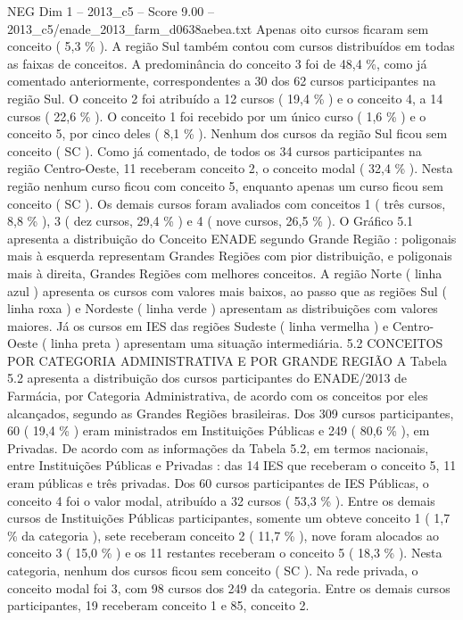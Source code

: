 \begin{textsample}{NEG Dim 1 – 2013\_c5 – Score 9.00 – 2013\_c5/enade\_2013\_farm\_d0638aebea.txt}
Apenas oito cursos ficaram sem conceito ( 5,3 \% ).
A região Sul também contou com cursos distribuídos em todas as faixas de conceitos.
A predominância do conceito 3 foi de 48,4 \%, como já comentado anteriormente, correspondentes a 30 dos 62 cursos participantes na região Sul.
O conceito 2 foi atribuído a 12 cursos ( 19,4 \% ) e o conceito 4, a 14 cursos ( 22,6 \% ).
O conceito 1 foi recebido por um único curso ( 1,6 \% ) e o conceito 5, por cinco deles ( 8,1 \% ).
Nenhum dos cursos da região Sul ficou sem conceito ( SC ).
Como já comentado, de todos os 34 cursos participantes na região Centro-Oeste, 11 receberam conceito 2, o conceito modal ( 32,4 \% ).
Nesta região nenhum curso ficou com conceito 5, enquanto apenas um curso ficou sem conceito ( SC ).
Os demais cursos foram avaliados com conceitos 1 ( três cursos, 8,8 \% ), 3 ( dez cursos, 29,4 \% ) e 4 ( nove cursos, 26,5 \% ).
O Gráfico 5.1 apresenta a distribuição do Conceito ENADE segundo Grande Região : poligonais mais à esquerda representam Grandes Regiões com pior distribuição, e poligonais mais à direita, Grandes Regiões com melhores conceitos.
A região Norte ( linha azul ) apresenta os cursos com valores mais baixos, ao passo que as regiões Sul ( linha roxa ) e Nordeste ( linha verde ) apresentam as distribuições com valores maiores.
Já os cursos em IES das regiões Sudeste ( linha vermelha ) e Centro-Oeste ( linha preta ) apresentam uma situação intermediária. 5.2 CONCEITOS POR CATEGORIA ADMINISTRATIVA E POR GRANDE REGIÃO A Tabela 5.2 apresenta a distribuição dos cursos participantes do ENADE/2013 de Farmácia, por Categoria Administrativa, de acordo com os conceitos por eles alcançados, segundo as Grandes Regiões brasileiras.
Dos 309 cursos participantes, 60 ( 19,4 \% ) eram ministrados em Instituições Públicas e 249 ( 80,6 \% ), em Privadas.
De acordo com as informações da Tabela 5.2, em termos nacionais, entre Instituições Públicas e Privadas : das 14 IES que receberam o conceito 5, 11 eram públicas e três privadas.
Dos 60 cursos participantes de IES Públicas, o conceito 4 foi o valor modal, atribuído a 32 cursos ( 53,3 \% ).
Entre os demais cursos de Instituições Públicas participantes, somente um obteve conceito 1 ( 1,7 \% da categoria ), sete receberam conceito 2 ( 11,7 \% ), nove foram alocados ao conceito 3 ( 15,0 \% ) e os 11 restantes receberam o conceito 5 ( 18,3 \% ).
Nesta categoria, nenhum dos cursos ficou sem conceito ( SC ).
Na rede privada, o conceito modal foi 3, com 98 cursos dos 249 da categoria.
Entre os demais cursos participantes, 19 receberam conceito 1 e 85, conceito 2.

\end{textsample}
